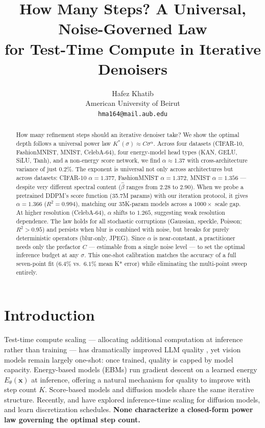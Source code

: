 \documentclass[letterpaper]{article}
\title{How Many Steps? A Universal, Noise-Governed Law\\for Test-Time Compute in Iterative Denoisers}
\author{%
  Hafez Khatib \\
  American University of Beirut \\
  \texttt{hma164@mail.aub.edu}
}
\newcommand{\xx}{\mathbf{x}}
\begin{document}
\maketitle

\begin{abstract}
How many refinement steps should an iterative denoiser take?
We show the optimal depth follows a universal power law
$K^{*}(\sigma) \approx C\sigma^{\alpha}$.
Across four datasets (CIFAR-10, FashionMNIST, MNIST, CelebA-64),
four energy-model head types (KAN, GELU, SiLU, Tanh),
and a non-energy score network, we find $\alpha \approx 1.37$
with cross-architecture variance of just $0.2\%$.
The exponent is universal not only across architectures but across
datasets: CIFAR-10 $\alpha{=}1.377$, FashionMNIST $\alpha{=}1.372$,
MNIST $\alpha{=}1.356$ --- despite very different spectral content
($\hat\beta$ ranges from $2.28$ to $2.90$).
When we probe a pretrained DDPM's score function (35.7M params)
with our iteration protocol, it gives $\alpha{=}1.366$
($R^2{=}0.994$), matching our 35K-param models across a
$1000\times$ scale gap.
At higher resolution (CelebA-64), $\alpha$ shifts to $1.265$,
suggesting weak resolution dependence.
The law holds for all stochastic corruptions
(Gaussian, speckle, Poisson; $R^2 > 0.95$) and persists when
blur is combined with noise, but breaks for purely deterministic
operators (blur-only, JPEG).
Since $\alpha$ is near-constant, a practitioner needs only the
prefactor $C$ --- estimable from a single noise level ---
to set the optimal inference budget at any $\sigma$.
This one-shot calibration matches the accuracy of a full
seven-point fit ($6.4\%$ vs.\ $6.1\%$ mean K* error)
while eliminating the multi-point sweep entirely.
\end{abstract}

\section{Introduction}
\label{sec:intro}

Test-time compute scaling --- allocating additional computation at
inference rather than training --- has dramatically improved LLM
quality \citep{snell2024llm}, yet vision models remain largely
one-shot: once trained, quality is capped by model capacity.
Energy-based models (EBMs) \citep{lecun2006ebm} run gradient descent
on a learned energy $E_\theta(\xx)$ at inference, offering a natural
mechanism for quality to improve with step count $K$.
Score-based models \citep{song2019generative} and diffusion models
\citep{ho2020ddpm} share the same iterative structure.
Recently, \citet{ma2025inference} and \citet{singhal2025fk}
have explored inference-time scaling for diffusion models,
and \citet{tong2025ld3} learn discretization schedules.
\textbf{None characterize a closed-form power law
governing the optimal step count.}
\end{document}
